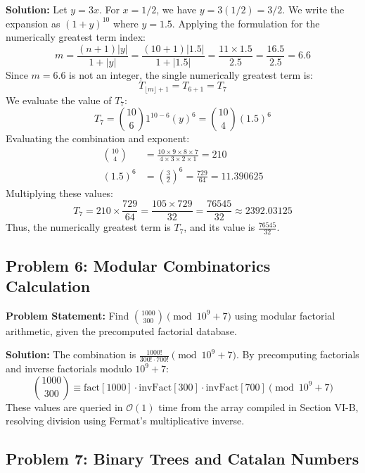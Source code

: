 \documentclass[10pt,journal,compsoc,onecolumn]{IEEEtran}
\begin{document}
\textbf{Solution:}
Let $y = 3x$. For $x = 1/2$, we have $y = 3(1/2) = 3/2$.
We write the expansion as $(1+y)^{10}$ where $y = 1.5$.
Applying the formulation for the numerically greatest term index:
\begin{equation}
m = \frac{(n+1)|y|}{1 + |y|} = \frac{(10+1)|1.5|}{1 + |1.5|} = \frac{11 \times 1.5}{2.5} = \frac{16.5}{2.5} = 6.6
\end{equation}
Since $m = 6.6$ is not an integer, the single numerically greatest term is:
\begin{equation}
T_{\lfloor m \rfloor + 1} = T_{6 + 1} = T_7
\end{equation}
We evaluate the value of $T_7$:
\begin{equation}
T_7 = \binom{10}{6} 1^{10-6} (y)^6 = \binom{10}{4} (1.5)^6
\end{equation}
Evaluating the combination and exponent:
\begin{align}
\binom{10}{4} &= \frac{10 \times 9 \times 8 \times 7}{4 \times 3 \times 2 \times 1} = 210 \\
(1.5)^6 &= \left(\frac{3}{2}\right)^6 = \frac{729}{64} = 11.390625
\end{align}
Multiplying these values:
\begin{equation}
T_7 = 210 \times \frac{729}{64} = \frac{105 \times 729}{32} = \frac{76545}{32} \approx 2392.03125
\end{equation}
Thus, the numerically greatest term is \textbf{$T_7$}, and its value is \textbf{$\frac{76545}{32}$}.

\subsection{Problem 6: Modular Combinatorics Calculation}

\textbf{Problem Statement:}
Find $\binom{1000}{300} \pmod{10^9+7}$ using modular factorial arithmetic, given the precomputed factorial database.

\textbf{Solution:}
The combination is $\frac{1000!}{300! \cdot 700!} \pmod{10^9+7}$.
By precomputing factorials and inverse factorials modulo $10^9+7$:
\begin{equation}
\binom{1000}{300} \equiv \text{fact}[1000] \cdot \text{invFact}[300] \cdot \text{invFact}[700] \pmod{10^9+7}
\end{equation}
These values are queried in $\mathcal{O}(1)$ time from the array compiled in Section VI-B, resolving division using Fermat's multiplicative inverse.

\subsection{Problem 7: Binary Trees and Catalan Numbers}
\end{document}
